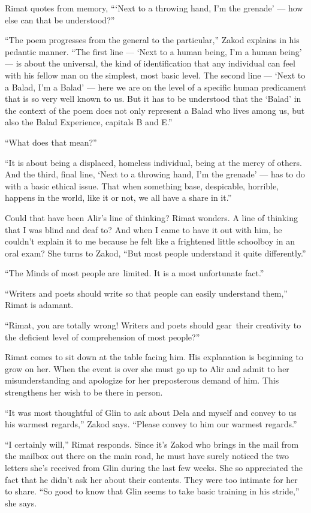 \documentclass[twoside,11pt]{book}
\begin{document}
Rimat quotes from memory, ``{\thinspace}`Next to a throwing hand, I'm the grenade' --- how else can that be
understood?''

``The poem progresses from the general to the particular,'' Zakod explains in his pedantic
manner. ``The first line --- `Next to a human being, I'm a human being' --- is about the universal, the kind
of identification that any individual can feel with his fellow man on the simplest, most basic level. The second line
--- `Next to a Balad, I'm a Balad' --- here we are on the level of a specific human predicament that is so very well
known to us. But it has to be understood that the `Balad' in the context of the poem does not only represent a Balad
who lives among us, but also the Balad Experience, capitals B and E.''

{}``What does that mean?''

``It is about being a displaced, homeless individual, being at the mercy of others. And the third, final
line, `Next to a throwing hand, I'm the grenade' --- has to do with a basic ethical issue. That when something base,
despicable, horrible, happens in the world, like it or not, we all have a share in
it.''

Could that have been Alir's line of thinking?  Rimat wonders.  A line of thinking that I was blind and deaf to? And
when I came to have it out with him, he couldn't explain it to me because he felt like a frightened little schoolboy in
an oral exam? She turns to{ }Zakod, ``But most people understand
it quite differently.''

``The Minds of most people are~limited. It is a most unfortunate fact.''

``Writers and poets should write so that people can easily understand them,'' Rimat is
adamant.

``Rimat, you are totally wrong! Writers and poets should gear~their creativity to the deficient level of
comprehension of most people?''

Rimat comes to sit down at the table facing him. His explanation is beginning to grow on her. When the event is over she
must go up to Alir and admit to her misunderstanding and apologize for her preposterous demand of him. This strengthens
her wish to be there in person.

``It was most thoughtful of Glin to ask about Dela and{ }myself and convey to us his
warmest regards,'' Zakod says. ``Please convey to him our warmest regards.''

``I certainly will,'' Rimat responds. Since it's Zakod who brings in the mail from the mailbox
out there on the main road, he must have surely noticed   the two letters she's received from Glin during the last
few weeks. She so appreciated the fact that he didn't ask her about their contents. They were too intimate for her to
share. ``So good to know that Glin seems to take basic training in his stride,'' she says.
\end{document}
